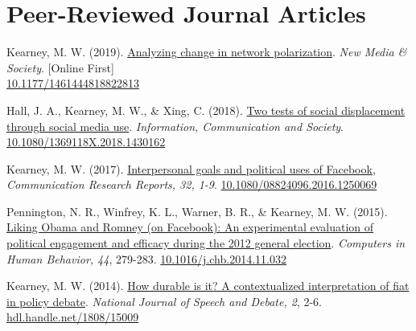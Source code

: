 \section{Peer-Reviewed Journal Articles}
\begin{bibenum}

\item Kearney, M. W. (2019).
	\href{https://doi.org/10.1177/1461444818822813}{Analyzing change in network polarization}.
	\textit{New Media \& Society}. [Online First]\\
	\href{https://doi.org/10.1177/1461444818822813}{10.1177/1461444818822813}

\item Hall, J. A., Kearney, M. W., \& Xing, C. (2018).
	\href{https://www.tandfonline.com/doi/abs/10.1080/1369118X.2018.1430162}{Two tests of social displacement through social media use}.
	\textit{Information, Communication and Society}.
	\href{https://doi.org/10.1080/1369118X.2018.1430162}{10.1080/1369118X.2018.1430162}

\item Kearney, M. W. (2017).
	\href{http://www.tandfonline.com/doi/abs/10.1080/08824096.2016.1250069}{Interpersonal goals and political uses of Facebook},
	\textit{Communication Research Reports, 32, 1-9}.
	\href{https://doi.org/10.1080/08824096.2016.1250069}{10.1080/08824096.2016.1250069}

\item Pennington, N. R., Winfrey, K. L., Warner, B. R., \& Kearney, M. W. (2015).
	\href{https://www.sciencedirect.com/science/article/pii/S0747563214006347}{Liking Obama and Romney (on Facebook): An experimental evaluation of political engagement and efficacy during the 2012 general election}.
	\textit{Computers in Human Behavior, 44}, 279-283.
	\href{https://doi.org/10.1016/j.chb.2014.11.032}{10.1016/j.chb.2014.11.032}

\item Kearney, M. W. (2014). \href{http://ssrn.com/abstract=2618298}{
	How durable is it? A contextualized interpretation of fiat in policy debate}.
	\textit{National Journal of Speech and Debate, 2}, 2-6.
	\href{http://hdl.handle.net/1808/15009}{hdl.handle.net/1808/15009}

\end{bibenum}


